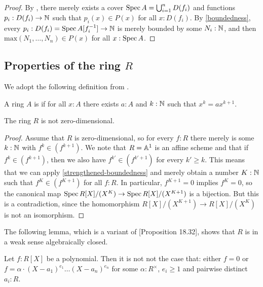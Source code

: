 \begin{proof}
  By ,
  there merely exists a cover
  $\operatorname{Spec} A = \bigcup_{i = 1}^n D(f_i)$
  and functions $p_i : D(f_i) \to \mathbb{N}$
  such that $p_i(x) \in P(x)$ for all $x : D(f_i)$.
  By \cref{boundedness},
  every $p_i : D(f_i) = \operatorname{Spec} A[f_i^{-1}] \to \mathbb{N}$
  is merely bounded by some $N_i : \mathbb{N}$,
  and then $\mathrm{max}(N_1, \dots, N_n) \in P(x)$ for all $x : \operatorname{Spec} A$.
\end{proof}

\subsection{Properties of the ring $R$}

We adopt the following definition from
\cite[Section IV.8]{lombardi-quitte}.

\begin{definition}%
  \label{zero-dimensional-ring}
  A ring $A$ is 
  if for all $x : A$
  there exists $a : A$ and $k : \mathbb{N}$
  such that $x^k = a x^{k + 1}$.
\end{definition}

\begin{lemma}%
  \label{R-not-zero-dimensional}
  The ring $R$ is not zero-dimensional.
\end{lemma}

\begin{proof}
  Assume that $R$ is zero-dimensional,
  so for every $f : R$ there merely is some $k : \mathbb{N}$ with $f^k \in (f^{k + 1})$.
  We note that $R = \mathbb{A}^1$ is an affine scheme and
  that if $f^k \in (f^{k + 1})$,
  then we also have $f^{k'} \in (f^{k' + 1})$ for every $k' \geq k$.
  This means that we can apply \cref{strengthened-boundedness}
  and merely obtain a number $K : \mathbb{N}$
  such that $f^K \in (f^{K + 1})$ for all $f : R$.
  In particular, $f^{K + 1} = 0$ implies $f^K = 0$,
  so the canonical map
  $\operatorname{Spec} R[X]/(X^K) \to \operatorname{Spec} R[X]/(X^{K + 1})$
  is a bijection.
  But this is a contradiction,
  since the homomorphism $R[X]/(X^{K + 1}) \to R[X]/(X^K)$
  is not an isomorphism.
\end{proof}

The following lemma,
which is a variant of \cite{ingo-thesis}[Proposition 18.32],
shows that $R$ is in a weak sense algebraically closed.

\begin{lemma}%
  \label{polynomials-notnot-decompose}
  Let $f : R[X]$ be a polynomial.
  Then it is not not the case that:
  either $f = 0$ or
  $f = \alpha \cdot {(X - a_1)}^{e_1} \dots {(X - a_n)}^{e_n}$
  for some $\alpha : R^\times$,
  $e_i \geq 1$ and pairwise distinct $a_i : R$.
\end{lemma}

